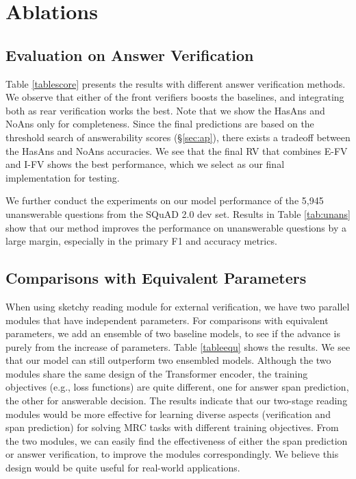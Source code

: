\documentclass[letterpaper]{article} %
\begin{document}
\section{Ablations}

\subsection{Evaluation on Answer Verification}
Table \ref{tablescore} presents the results with different answer verification methods. We observe that either of the front verifiers boosts the baselines, and integrating both as rear verification works the best. Note that we show the HasAns and NoAns only for completeness. Since the final predictions are based on the threshold search of answerability scores (\S\ref{sec:ap}), there exists a tradeoff between the HasAns and NoAns accuracies. We see that the final RV that combines E-FV and I-FV shows the best performance, which we select as our final implementation for testing.


We further conduct the experiments on our model performance of the 5,945 unanswerable questions from the SQuAD 2.0 dev set. Results in Table \ref{tab:unans} show that our method improves the performance on unanswerable questions by a large margin, especially in the primary F1 and accuracy metrics.


\subsection{Comparisons with Equivalent Parameters}
When using sketchy reading module for external verification, we have two parallel modules that have independent parameters. For comparisons with equivalent parameters, we add an ensemble of two baseline models, to see if the advance is purely from the increase of parameters. Table \ref{tableequ} shows the results. We see that our model can still outperform two ensembled models. Although the two modules share the same design of the Transformer encoder, the training objectives (e.g., loss functions) are quite different, one for answer span prediction, the other for answerable decision. The results indicate that our two-stage reading modules would be more effective for learning diverse aspects (verification and span prediction) for solving MRC tasks with different training objectives. From the two modules, we can easily find the effectiveness of either the span prediction or answer verification, to improve the modules correspondingly. We believe this design would be quite useful for real-world applications.
\end{document}
